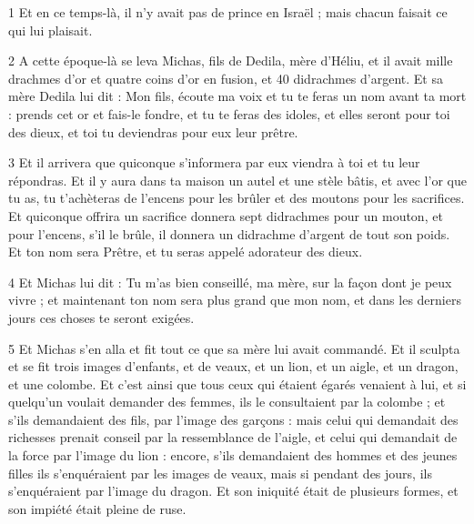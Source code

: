 \par 1 Et en ce temps-là, il n'y avait pas de prince en Israël ; mais chacun faisait ce qui lui plaisait.

\par 2 A cette époque-là se leva Michas, fils de Dedila, mère d'Héliu, et il avait mille drachmes d'or et quatre coins d'or en fusion, et 40 didrachmes d'argent. Et sa mère Dedila lui dit : Mon fils, écoute ma voix et tu te feras un nom avant ta mort : prends cet or et fais-le fondre, et tu te feras des idoles, et elles seront pour toi des dieux, et toi tu deviendras pour eux leur prêtre.

\par 3 Et il arrivera que quiconque s'informera par eux viendra à toi et tu leur répondras. Et il y aura dans ta maison un autel et une stèle bâtis, et avec l'or que tu as, tu t'achèteras de l'encens pour les brûler et des moutons pour les sacrifices. Et quiconque offrira un sacrifice donnera sept didrachmes pour un mouton, et pour l'encens, s'il le brûle, il donnera un didrachme d'argent de tout son poids. Et ton nom sera Prêtre, et tu seras appelé adorateur des dieux.

\par 4 Et Michas lui dit : Tu m'as bien conseillé, ma mère, sur la façon dont je peux vivre ; et maintenant ton nom sera plus grand que mon nom, et dans les derniers jours ces choses te seront exigées.

\par 5 Et Michas s'en alla et fit tout ce que sa mère lui avait commandé. Et il sculpta et se fit trois images d'enfants, et de veaux, et un lion, et un aigle, et un dragon, et une colombe. Et c'est ainsi que tous ceux qui étaient égarés venaient à lui, et si quelqu'un voulait demander des femmes, ils le consultaient par la colombe ; et s'ils demandaient des fils, par l'image des garçons : mais celui qui demandait des richesses prenait conseil par la ressemblance de l'aigle, et celui qui demandait de la force par l'image du lion : encore, s'ils demandaient des hommes et des jeunes filles ils s'enquéraient par les images de veaux, mais si pendant des jours, ils s'enquéraient par l'image du dragon. Et son iniquité était de plusieurs formes, et son impiété était pleine de ruse.

